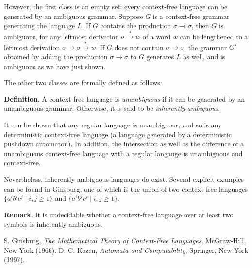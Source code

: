 \documentclass[12pt]{article}
\begin{document}
However, the first class is an empty set: every context-free language can be generated by an ambiguous grammar.  Suppose $G$ is a context-free grammar generating the language $L$.  If $G$ contains the production $\sigma\to \sigma$, then $G$ is ambiguous, for any leftmost derivation $\sigma \stackrel{*}{\to} w$ of a word $w$ can be lengthened to a leftmost derivation $\sigma \to \sigma \stackrel{*}{\to} w$.  If $G$ does not contain $\sigma\to \sigma$, the grammar $G'$ obtained by adding the production $\sigma \to \sigma$ to $G$ generates $L$ as well, and is ambiguous as we have just shown.

The other two classes are formally defined as follows:

\textbf{Definition}.  A context-free language is \emph{unambiguous} if it can be generated by an unambiguous grammar.  Otherwise, it is said to be \emph{inherently ambiguous}.

It can be shown that any regular language is unambiguous, and so is any deterministic context-free language (a language generated by a deterministic pushdown automaton).  In addition, the intersection as well as the difference of a unambiguous context-free language with a regular langauge is unambiguous and context-free.

Nevertheless, inherently ambiguous languages do exist.  Several explicit examples can be found in Ginsburg, one of which is the union of two context-free languages $\lbrace a^ib^ic^j\mid i,j\ge 1\rbrace$ and $\lbrace a^ib^jc^j\mid i,j\ge 1\rbrace$.

\textbf{Remark}.  It is undecidable whether a context-free language over at least two symbols is inherently ambiguous.

\begin{thebibliography}{9}
 S. Ginsburg, {\em The Mathematical Theory of Context-Free Languages}, McGraw-Hill, New York (1966).
 D. C. Kozen, {\em Automata and Computability}, Springer, New York (1997).
\end{thebibliography}
\end{document}
